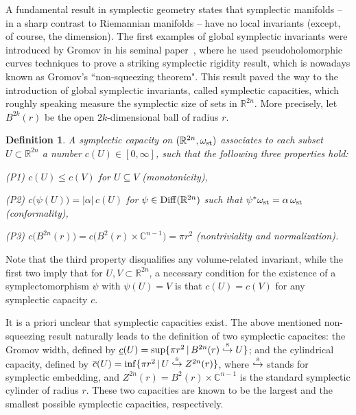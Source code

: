 \documentclass[11pt]{article}
\newtheorem{definition}[lemma]{Definition}
\begin{document}
A  fundamental result in symplectic geometry states that 
symplectic manifolds -- in a sharp contrast to Riemannian manifolds -- have 
no local invariants (except, of course, the dimension). 
The first examples of global symplectic invariants were  introduced by Gromov in his 
seminal paper~\cite{G}, where he used  pseudoholomorphic curves techniques to prove a striking symplectic  rigidity result,  
which is nowadays known as Gromov's ``non-squeezing theorem".  This result paved the way to the introduction of global symplectic 
invariants, called symplectic capacities, which 
roughly speaking measure the symplectic size of sets in ${\mathbb
R}^{2n}$. More precisely, let $B^{2k}(r)$ be the open $2k$-dimensional ball of radius $r$.

\begin{definition} \label{Def-sym-cap}
A symplectic capacity on $({\mathbb R}^{2n},\omega_{\rm st})$ associates
to each  subset $U \subset {\mathbb R}^{2n}$ a number $c(U) \in
[0,\infty]$, such that the following three properties hold:

\noindent (P1) $c(U) \leq c(V)$ for $U \subseteq V$ (monotonicity),

\noindent (P2) $c \big (\psi(U) \big )= |\alpha| \, c(U)$ for  $\psi
\in {\rm Diff} ( {\mathbb R}^{2n} )$ such that $\psi^*\omega_{\rm st} =
\alpha \, \omega_{\rm st}$ (conformality),

\noindent (P3) $c \big (B^{2n}(r) \big ) = c \big (B^2(r) \times
{\mathbb C}^{n-1} \big ) = \pi r^2$ (nontriviality and
normalization).
\end{definition}
Note that the third property disqualifies any volume-related invariant, while the first two imply that for 
$U, V \subset {\mathbb  R}^{2n}$, a necessary condition for the existence of a symplectomorphism $\psi$ 
with $\psi(U) = V$ is that $c(U ) = c(V)$ for any symplectic capacity $c$. 

It is a priori unclear that symplectic capacities exist. 
The above mentioned non-squeezing result naturally leads to the definition of two symplectic 
capacites: the Gromov width, defined by $\underline c(U)=\sup\{\pi r^2 \, | \,  B^{2n}(r) \stackrel{\rm s} \hookrightarrow U \} $; and the 
cylindrical capacity, defined by $\overline c(U) = \inf\{\pi r^2 \, | \, U \stackrel{\rm s} \hookrightarrow Z^{2n}(r) \} $, where $\stackrel{\rm s} \hookrightarrow$ stands for symplectic embedding, and $Z^{2n}(r)=B^2(r) \times
{\mathbb C}^{n-1}$ is the standard symplectic cylinder of radius $r$. 
These two capacities are known to be the largest and the smallest possible symplectic capacities, respectively. 
\end{document}
